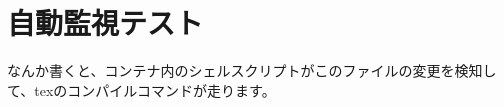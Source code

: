 \documentclass[a4paper,xelatex,ja=standard]{bxjsarticle}
\begin{document}
  \section{自動監視テスト}
  なんか書くと、コンテナ内のシェルスクリプトがこのファイルの変更を検知して、texのコンパイルコマンドが走ります。

  
  
\end{document}
